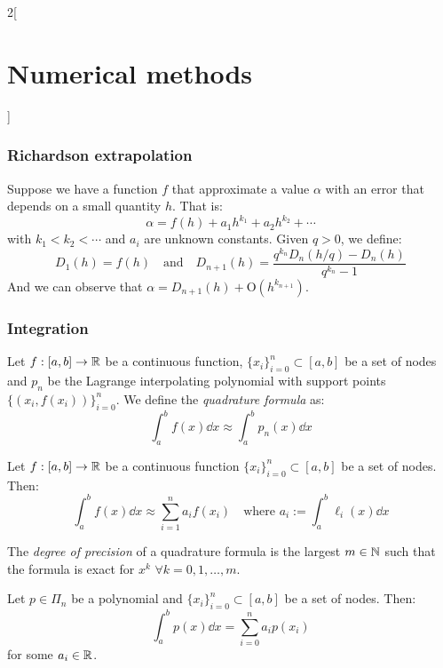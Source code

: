\documentclass[../../../main_math.tex]{subfiles}
\begin{document}
\begin{multicols}{2}[\section{Numerical methods}]
  \subsubsection{Richardson extrapolation}
  \begin{theorem}
    Suppose we have a function $f$ that approximate a value $\alpha$ with an error that depends on a small quantity $h$. That is: $$\alpha=f(h)+a_1h^{k_1}+a_2h^{k_2}+\cdots$$ with $k_1<k_2<\cdots$ and $a_i$ are unknown constants. Given $q>0$, we define: $$D_1(h)=f(h)\quad\text{and}\quad D_{n+1}(h)=\frac{q^{k_n}D_n\left(h/q\right)-D_n(h)}{q^{k_n}-1}$$ And we can observe that $\alpha=D_{n+1}(h)+\text{O}(h^{k_{n+1}})$.
  \end{theorem}
  \subsubsection{Integration}
  \begin{definition}
    Let $f:[a,b]\rightarrow\mathbb{R}$ be a continuous function, $\{x_i\}_{i=0}^n\subset[a,b]$ be a set of nodes and $p_n$ be the Lagrange interpolating polynomial with support points $\{(x_i,f(x_i))\}_{i=0}^n$. We define the \emph{quadrature formula} as: $$\int_a^bf(x)\dd{x}\approx\int_a^bp_n(x)\dd{x}$$
  \end{definition}
  \begin{lemma}
    Let $f:[a,b]\rightarrow\mathbb{R}$ be a continuous function $\{x_i\}_{i=0}^n\subset[a,b]$ be a set of nodes. Then: $$\int_a^bf(x)\dd{x}\approx\sum_{i=1}^na_if(x_i)\quad\text{where }a_i:=\int_a^b\ell_i(x)\dd{x}$$
  \end{lemma}
  \begin{definition}
    The \emph{degree of precision} of a quadrature formula is the largest $m\in\mathbb{N}$ such that the formula is exact for $x^k$ $\forall k=0,1,\ldots,m$.
  \end{definition}
  \begin{lemma}
    Let $p\in\Pi_n$ be a polynomial and $\{x_i\}_{i=0}^n\subset[a,b]$ be a set of nodes. Then: $$\int_a^bp(x)\dd{x}=\sum_{i=0}^na_ip(x_i)$$ for some $a_i\in\mathbb{R}$.
  \end{lemma}

\end{multicols}
\end{document}
